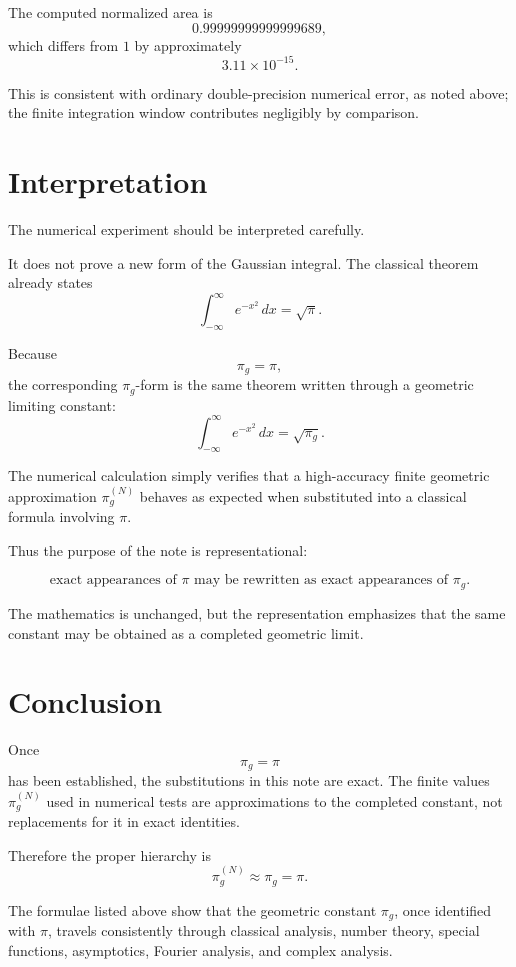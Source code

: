 \documentclass[11pt]{article}
\begin{document}
The computed normalized area is
\[
0.99999999999999689,
\]
which differs from \(1\) by approximately
\[
3.11\times 10^{-15}.
\]

This is consistent with ordinary double-precision numerical error, as noted
above; the finite integration window contributes negligibly by comparison.

\section{Interpretation}

The numerical experiment should be interpreted carefully.

It does not prove a new form of the Gaussian integral. The classical theorem
already states
\[
\int_{-\infty}^{\infty}e^{-x^2}\,dx=\sqrt{\pi}.
\]

Because
\[
\pi_g=\pi,
\]
the corresponding \(\pi_g\)-form is the same theorem written through a
geometric limiting constant:
\[
\int_{-\infty}^{\infty}e^{-x^2}\,dx=\sqrt{\pi_g}.
\]

The numerical calculation simply verifies that a high-accuracy finite
geometric approximation \(\pi_g^{(N)}\) behaves as expected when substituted
into a classical formula involving \(\pi\).

Thus the purpose of the note is representational:

\[
\text{exact appearances of } \pi
\text{ may be rewritten as exact appearances of } \pi_g.
\]

The mathematics is unchanged, but the representation emphasizes that the same
constant may be obtained as a completed geometric limit.

\section{Conclusion}

Once
\[
\pi_g=\pi
\]
has been established, the substitutions in this note are exact. The finite
values \(\pi_g^{(N)}\) used in numerical tests are approximations to the
completed constant, not replacements for it in exact identities.

Therefore the proper hierarchy is
\[
\pi_g^{(N)}
\approx
\pi_g
=
\pi.
\]

The formulae listed above show that the geometric constant \(\pi_g\), once
identified with \(\pi\), travels consistently through classical analysis,
number theory, special functions, asymptotics, Fourier analysis, and complex
analysis.
\end{document}
